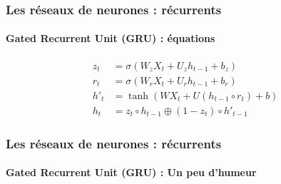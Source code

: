 \documentclass[xcolor=table]{beamer}
\begin{document}
\begin{frame}
	\frametitle{Les réseaux de neurones : récurrents}
	\framesubtitle{Gated Recurrent Unit (GRU) : équations}
	
	\begin{align*}
	z_t &= \sigma(W_z X_t + U_z h_{t-1} + b_z) \\
	r_t &= \sigma(W_r X_t + U_r h_{t-1} + b_r) \\
	h'_t &= \tanh(W X_t + U (h_{t-1} \circ r_t) + b) \\
	h_t &= z_t \circ h_{t-1} \oplus (1-z_t) \circ h'_{t-1}
	\end{align*}
	
\end{frame}

\begin{frame}
	\frametitle{Les réseaux de neurones : récurrents}
	\framesubtitle{Gated Recurrent Unit (GRU) : Un peu d'humeur}
	
	\begin{center}
	\end{center}
	
\end{frame}

\end{document}
